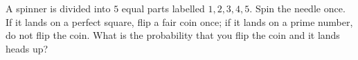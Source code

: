 A spinner is divided into $5$ equal parts labelled $1,2,3,4,5$. Spin the needle once. If it lands on a perfect square, flip a fair coin once; if it lands on a prime number, do not flip the coin. What is the probability that you flip the coin and it lands heads up?
